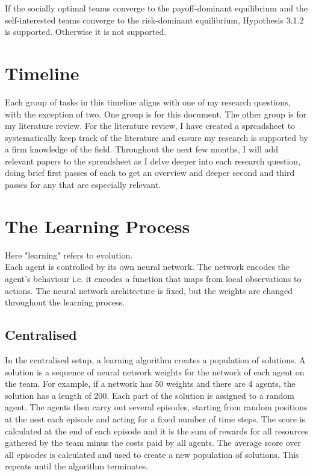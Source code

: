 \documentclass[12pt]{article}
\begin{document}
If the socially optimal teams converge to the payoff-dominant equilibrium and the self-interested teams converge to the risk-dominant equilibrium, Hypothesis 3.1.2 is supported.
Otherwise it is not supported.\\

\section{Timeline} \label{timeline}

Each group of tasks in this timeline aligns with one of my research questions, with the exception of two.
One group is for this document.
The other group is for my literature review.
For the literature review, I have created a spreadsheet to systematically keep track of the literature and ensure my research is supported by a firm knowledge of the field. 
Throughout the next few months, I will add relevant papers to the spreadsheet as I delve deeper into each research question, doing brief first passes of each to get an overview and deeper second and third passes for any that are especially relevant.\\






\appendix

\section{The Learning Process}\label{learning}

Here "learning" refers to evolution.\\

Each agent is controlled by its own neural network. 
The network encodes the agent’s behaviour i.e. it encodes a function that maps from local observations to actions. 
The neural network architecture is fixed, but the weights are changed throughout the learning process.\\

\subsection{Centralised}

In the centralised setup, a learning algorithm creates a population of solutions. 
A solution is a sequence of neural network weights for the network of each agent on the team. 
For example, if a network has 50 weights and there are 4 agents, the solution has a length of 200. 
Each part of the solution is assigned to a random agent. 
The agents then carry out several episodes, starting from random positions at the nest each episode and acting for a fixed number of time steps. 
The score is calculated at the end of each episode and it is the sum of rewards for all resources gathered by the team minus the costs paid by all agents. 
The average score over all episodes is calculated and used to create a new population of solutions. 
This repeats until the algorithm terminates.\\
\end{document}
